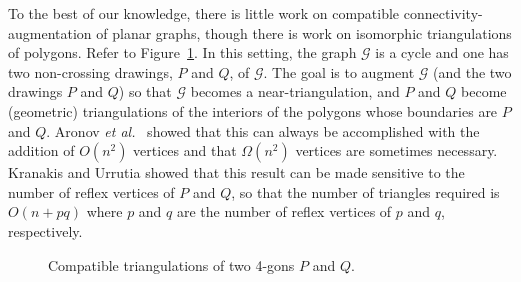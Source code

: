 \documentclass[11pt]{patmorin}
\newcommand{\etal}{\emph{et al.}}
\begin{document}
To the best of our knowledge, there is little work on
compatible connectivity-augmentation of planar graphs, though
there is work on isomorphic triangulations of polygons.  Refer to
Figure~\ref{fig:compatible-triangs}.  In this setting, the graph
$\mathcal{G}$ is a cycle and one has two non-crossing drawings, $P$
and $Q$, of $\mathcal G$. The goal is to augment $\mathcal G$ (and the
two drawings $P$ and $Q$) so that $\mathcal G$ becomes a near-triangulation,
and $P$ and $Q$ become (geometric) triangulations of the interiors
of the polygons whose boundaries are $P$ and $Q$.  Aronov \etal\
\cite{aronov.seidel.ea:on} showed that this can always
be accomplished with the addition of $O(n^2)$ vertices and that
$\Omega(n^2)$ vertices are sometimes necessary.  Kranakis and Urrutia
\cite{kranakis.urrutia:isomorphic} showed that this result can be made
sensitive to the number of reflex vertices of $P$ and $Q$, so that the
number of triangles required is $O(n+pq)$ where $p$ and $q$ are the
number of reflex vertices of $p$ and $q$, respectively.

\begin{figure}
  \caption{Compatible triangulations of two 4-gons $P$ and $Q$.}
  \label{fig:compatible-triangs}
\end{figure}
\end{document}
